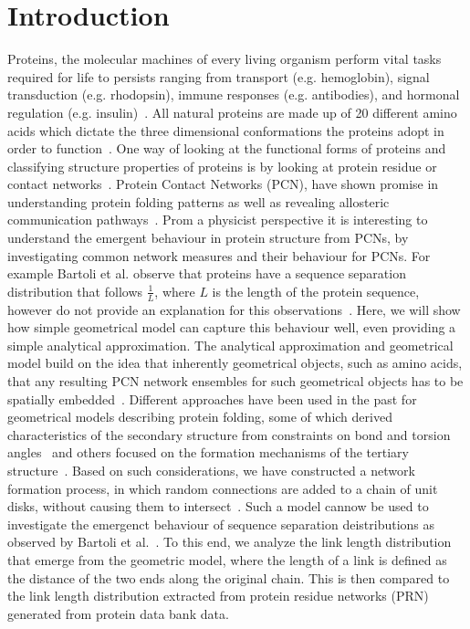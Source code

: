 \documentclass[reprint,amsmath,amssymb,rmp,onecolumn,notitlepage,11pt]{revtex4-1}
\begin{document}
\section*{Introduction}
Proteins, the molecular machines of every living organism perform vital tasks required for life to persists ranging from transport (e.g. hemoglobin), signal transduction (e.g. rhodopsin), immune responses (e.g. antibodies), and hormonal regulation (e.g. insulin)~\cite{}. All natural proteins are made up of 20 different amino acids which dictate the three dimensional conformations the proteins adopt in order to function~\cite{}. One way of looking at the functional forms of proteins and classifying structure properties of proteins is by looking at protein residue or contact networks~\cite{Vendruscolo2002,DiPaola2013,Estrada2011}. Protein Contact Networks (PCN), have shown promise in understanding protein folding patterns as well as revealing allosteric communication pathways~\cite{https://pubs.acs.org/doi/10.1021/acs.jcim.9b00320, and others}. 
Prom a physicist perspective it is interesting to understand the emergent behaviour in protein structure from PCNs, by investigating common network measures and their behaviour for PCNs. For example Bartoli et al. observe that proteins have a sequence separation distribution that follows $\frac{1}{L}$, where $L$ is the length of the protein sequence, however do not provide an explanation for this observations~\cite{bartoli2008effect}. 
Here, we will show how simple geometrical model can capture this behaviour well, even providing a simple analytical approximation. The analytical approximation and geometrical model build on the idea that inherently geometrical objects, such as amino acids, that any resulting PCN network ensembles for such geometrical objects has to be spatially embedded~\cite{Grabow2010,Wu2015}. 
Different approaches have been used in the past for geometrical models describing protein folding, some of which derived characteristics of the secondary structure from constraints on bond and torsion angles~\cite{Danielsson2010,Molkenthin2011} and others focused on the formation mechanisms of the tertiary structure~\cite{molkenthin2016scaling, molkenthin2020self}. Based on such considerations, we have constructed a network formation process, in which random connections are added to a chain of unit disks, without causing them to intersect~\cite{molkenthin2016scaling}. Such a model cannow be used to investigate the emergenct behaviour of sequence separation deistributions as observed by Bartoli et al.~\cite{bartoli2008effect}. To this end, we analyze the link length distribution that emerge from the geometric model, where the length of a link is defined as the distance of the two ends along the original chain.
This is then compared to the link length distribution extracted from protein residue networks (PRN) generated from protein data bank data. 
\end{document}
